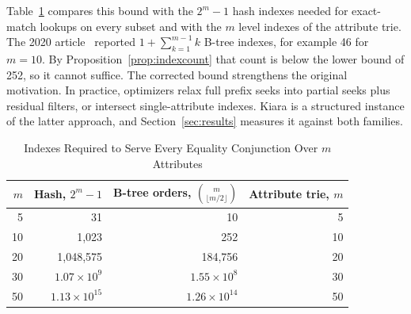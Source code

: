 Table~\ref{tab:indexcount} compares this bound with the $2^m-1$ hash indexes needed for exact-match lookups on every subset and with the $m$ level indexes of the attribute trie. The 2020 article~\cite{kapoor2020efficient} reported $1+\sum_{k=1}^{m-1}k$ B-tree indexes, for example 46 for $m=10$. By Proposition~\ref{prop:indexcount} that count is below the lower bound of 252, so it cannot suffice. The corrected bound strengthens the original motivation. In practice, optimizers relax full prefix seeks into partial seeks plus residual filters, or intersect single-attribute indexes. Kiara is a structured instance of the latter approach, and Section~\ref{sec:results} measures it against both families.

\begin{table}[t]
\centering
\caption{Indexes Required to Serve Every Equality Conjunction Over $m$ Attributes}
\label{tab:indexcount}
\setlength{\tabcolsep}{4pt}
\begin{tabular}{@{}rrrr@{}}
\toprule
$m$ & Hash, $2^m-1$ & B-tree orders, $\binom{m}{\lfloor m/2\rfloor}$ & Attribute trie, $m$ \\
\midrule
5  & 31 & 10 & 5 \\
10 & 1{,}023 & 252 & 10 \\
20 & 1{,}048{,}575 & 184{,}756 & 20 \\
30 & $1.07\times10^{9}$ & $1.55\times10^{8}$ & 30 \\
50 & $1.13\times10^{15}$ & $1.26\times10^{14}$ & 50 \\
\bottomrule
\end{tabular}
\end{table}
